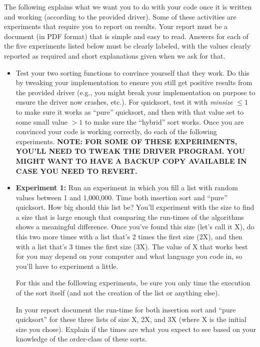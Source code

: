 \documentclass[11pt]{article}
\begin{document}
The following explains what we want you to do with your code once it is written and working (according to the provided driver). Some of these activities are experiments that require you to report on results. Your report must be a document (in PDF format) that is simple and easy to read. Answers for each of the five experiments listed below must be clearly labeled, with the values clearly reported as required and short explanations given when we ask for that.
\begin{itemize}

\item Test your two sorting functions to convince yourself that they work. Do this by tweaking your implementation to ensure you still get positive results from the provided driver (e.g., you might break your implementation on purpose to ensure the driver now crashes, etc.). For quicksort, test it with {\em minsize} $\leq 1$ to make sure it works as ``pure'' quicksort, and then with that value set to some small value $>1$ to make sure the ``hybrid'' sort works. Once you are convinced your code is working correctly, do each of the following experiments. \textbf{NOTE: FOR SOME OF THESE EXPERIMENTS, YOU'LL NEED TO TWEAK THE DRIVER PROGRAM. YOU MIGHT WANT TO HAVE A BACKUP COPY AVAILABLE IN CASE YOU NEED TO REVERT.}

\item {\bf Experiment 1:} Run an experiment in which you fill a list with random values between 1 and 1,000,000. Time both insertion sort and ``pure'' quicksort.  How big should this list be?  You'll experiment with the size to find a size that is large enough that comparing the run-times of the algorithms shows a meaningful difference.  Once you've found this size (let's call it X), do this two more times with a list that's 2 times the first size (2X), and then with a list that's 3 times the first size (3X). The value of X that works best for you may depend on your computer and what language you code in, so you'll have to experiment a little.

For this and the folllowing experiments, be sure you only time the execution of the sort itself (and not the creation of the list or anything else).

In your report document the run-time for both insertion sort and ``pure quicksort'' for these three lists of size X, 2X, and 3X (where X is the initial size you chose).  Explain if the times are what you expect to see based on your knowledge of the order-class of these sorts.


\end{itemize}
\end{document}
